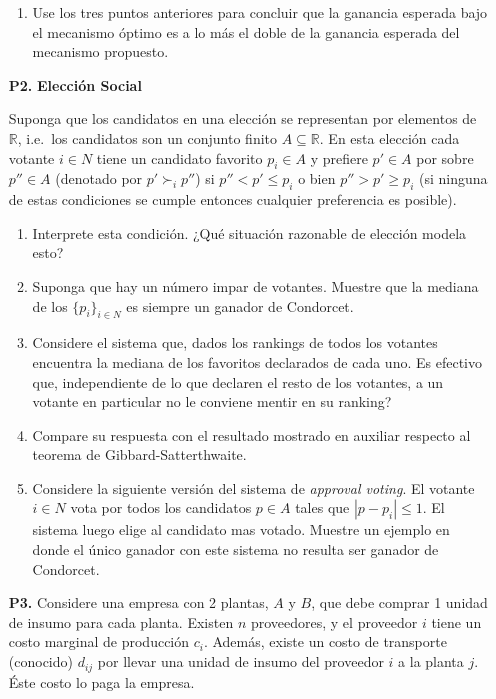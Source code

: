 \documentclass[11pt, spanish]{article}
\theoremstyle{plain}
\newcommand{\R}{\mathds{R}}
\begin{document}
\begin{itemize}
\begin{enumerate}
    \item Use los tres puntos anteriores para concluir que la ganancia esperada bajo el mecanismo
    óptimo es a lo más el doble de la ganancia esperada
    del mecanismo
    propuesto.
\end{enumerate}


  \item[\textbf{P2.}] {\bf Elección Social}
  
Suponga que los candidatos en una elecci\'on se representan por
elementos de $\R$, i.e.\ los candidatos son un conjunto finito $A
\subseteq \R$. En esta elecci\'on cada votante $i\in N$ tiene un
candidato favorito $p_i\in A$ y prefiere $p'\in A$ por sobre $p''\in
A$ (denotado por $p' \succ_i p''$) si $p''<p'\le p_i$ o bien
$p''>p'\ge p_i$ (si ninguna de estas condiciones se cumple entonces
cualquier preferencia es posible).

\begin{enumerate}
\item Interprete esta condición. ¿Qué situación razonable de elección
modela esto?
\item Suponga que hay un número impar de votantes. Muestre que la
mediana de los $\{p_i\}_{i \in {N}}$ es siempre un ganador de
Condorcet.
\item Considere el sistema que, dados los rankings de todos los
votantes encuentra la mediana de los favoritos declarados de cada uno.
Es efectivo que, independiente de lo que declaren el resto de los
votantes, a un votante en particular no le conviene mentir en su
ranking?
\item Compare su respuesta con el resultado mostrado en auxiliar
respecto al teorema de Gibbard-Satterthwaite.
\item Considere la siguiente versión del sistema de \emph{approval
voting}. El votante $i\in N$ vota por todos los candidatos $p\in A$
tales que $|{p-p_i}| \le 1$. El sistema luego elige al candidato mas
votado. Muestre un ejemplo en donde el \'unico ganador con este
sistema no resulta ser ganador de Condorcet.
\end{enumerate}

  \item[\textbf{P3.}] Considere una empresa con 2 plantas, $A$ y $B$,
que debe comprar 1 unidad de insumo para cada planta. Existen $n$
proveedores, y el proveedor $i$ tiene un costo marginal de
producci\'on $c_i$. Adem\'as, existe un costo de transporte (conocido)
$d_{ij}$ por llevar una unidad de insumo del  proveedor $i$ a la
planta $j$. \'Este costo lo paga la empresa.



\end{itemize}
\end{document}
